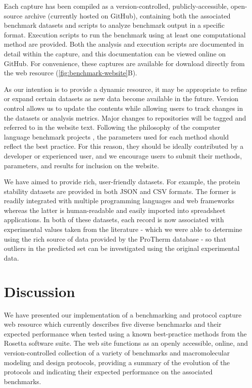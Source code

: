 Each capture has been compiled as a version-controlled, publicly-accessible, open-source archive (currently hosted on GitHub), containing both the associated benchmark datasets and scripts to analyze benchmark output in a specific format. Execution scripts to run the benchmark using at least one computational method are provided. Both the analysis and execution scripts are documented in detail within the capture, and this documentation can be viewed online on GitHub. For convenience, these captures are available for download directly from the web resource (\cref{fig:benchmark-website}B).

As our intention is to provide a dynamic resource, it may be appropriate to refine or expand certain datasets as new data become available in the future. Version control allows us to update the contents while allowing users to track changes in the datasets or analysis metrics. Major changes to repositories will be tagged and referred to in the website text. Following the philosophy of the computer language benchmark projects \cite{bagley_d_computer_2004,calpini_a_great_2003}, the parameters used for each method should reflect the best practice. For this reason, they should be ideally contributed by a developer or experienced user, and we encourage users to submit their methods, parameters, and results for inclusion on the website.

We have aimed to provide rich, user-friendly datasets. For example, the protein stability datasets are provided in both JSON and CSV formats. The former is readily integrated with multiple programming languages and web frameworks whereas the latter is human-readable and easily imported into spreadsheet applications. In both of these datasets, each record is now associated with experimental values taken from the literature - which we were able to determine using the rich source of data provided by the ProTherm database \cite{kumar_protherm_2006} - so that outliers in the predicted set can be investigated using the original experimental data.

\section{Discussion}

We have presented our implementation of a benchmarking and protocol capture web resource which currently describes five diverse benchmarks and their expected performance when tested using a known best-practice methods from the Rosetta software suite. The web site functions as an openly accessible, online, and version-controlled collection of a variety of benchmarks and macromolecular modeling and design protocols, providing a summary of the evolution of the protocols and indicating their expected performance on the associated benchmarks.

